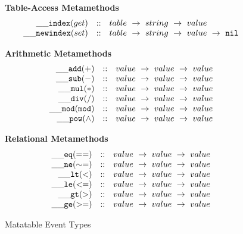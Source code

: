 \begin{figure}[P]
\caption{Matatable Event Types}
{\bf Table-Access Metamethods}
\label{fig:matatables}
\[
\begin{array}{rclcl}
  {\tt \_\_index}(get) & :: & {table} ~\rightarrow ~ {string} ~\rightarrow ~ {value} \\
  {\tt \_\_newindex}(set)   & :: &  {table} ~\rightarrow ~{string} ~\rightarrow ~{value} ~\rightarrow ~{\tt nil}\\
\end{array}
\]

{\bf Arithmetic Metamethods}
\[
\begin{array}{rclcl}
  {\tt \_\_add(+)}   & :: &  {value} ~\rightarrow ~{value}~\rightarrow ~{value}\\
  {\tt \_\_sub(-)}   & :: &  {value} ~\rightarrow ~{value}~\rightarrow ~{value}\\
  {\tt \_\_mul(*)}   & :: &  {value} ~\rightarrow ~{value}~\rightarrow ~{value}\\
  {\tt \_\_div(/)}   & :: &  {value} ~\rightarrow ~{value}~\rightarrow ~{value}\\
  {\tt \_\_mod(mod)}   & :: &  {value} ~\rightarrow ~{value}~\rightarrow ~{value}\\
  {\tt \_\_pow({\wedge})}   & :: &  {value} ~\rightarrow ~{value}~\rightarrow ~{value}\\
\end{array}
\]

{\bf Relational Metamethods}
\[
\begin{array}{rclcl}
  {\tt \_\_eq(==)} & :: & {value} ~\rightarrow ~ {value} ~\rightarrow ~ {value}\\
  {\tt \_\_ne(\sim=)} & :: & {value} ~\rightarrow ~ {value} ~\rightarrow ~ {value}\\
  {\tt \_\_lt(<)}   & :: &  {value} ~\rightarrow ~{value} ~\rightarrow ~{value}\\
  {\tt \_\_le(<=)}   & :: &  {value} ~\rightarrow ~{value} ~\rightarrow ~{value}\\
  {\tt \_\_gt(>)}   & :: &  {value} ~\rightarrow ~{value} ~\rightarrow ~{value}\\
  {\tt \_\_ge(>=)}   & :: &  {value} ~\rightarrow ~{value} ~\rightarrow ~{value}\\
\end{array}
\]
\end{figure}

\newcommand{\aFunction}[2]{\lambda{#1}.{#2}}

